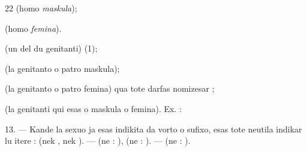 \begin{VUpage}[26]{22}
 (homo \textit{maskula});

 (homo \textit{femina}).

 (un del du genitanti) (1);

 (la genitanto o patro maskula);

 (la genitanto o patro femina) qua tote darfas\nl
nomizesar ;

 (la genitanti qui esas o maskula o femina). Ex. :\nl
{}\nl
{}

\VUblanc{8.81pt}%
13. --- Kande la sexuo ja esas indikita da vorto o sufixo,\nl
esas tote neutila indikar lu itere : \nl
{} (nek , nek ). --- \cc
{} (ne : ), \nl
{} (ne : ). --- \cc
{} (ne : ).
\end{VUpage}

